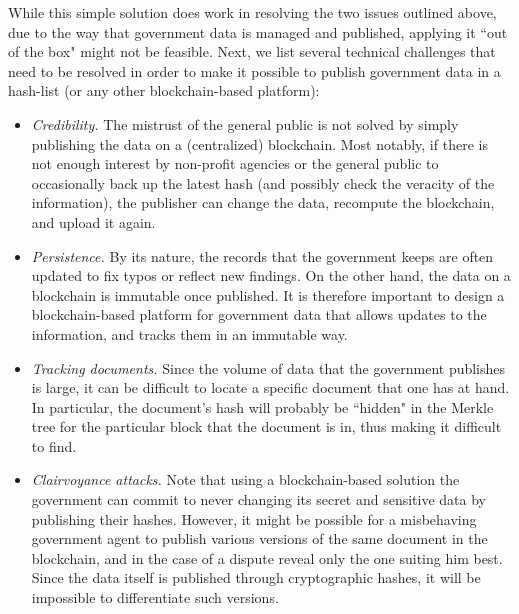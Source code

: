 While this simple solution does work in resolving the two issues outlined above, due to the way that government data is managed and published, applying it ``out of the box" might not be feasible. Next, we list several technical challenges that need to be resolved in order to make it possible to publish government data in a hash-list (or any other blockchain-based platform):
\begin{itemize}
\item {\it Credibility.} The mistrust of the general public is not solved by simply publishing the data on a (centralized) blockchain. Most notably, if there is not enough interest by non-profit agencies or the general public to occasionally back up the latest hash (and possibly check the veracity of the information), the publisher can change the data, recompute the blockchain, and upload it again. %
\item {\it Persistence.} By its nature, the records that the government keeps are often updated to fix typos or reflect new findings. On the other hand, the data on a blockchain is immutable once published. It is therefore important to design a blockchain-based platform for government data that allows updates to the information, and tracks them in an  immutable way.
\item {\it Tracking documents.} Since the volume of data that the government publishes is large, it can be difficult to locate a specific document that one has at hand. In particular, the document's hash will probably be ``hidden" in the Merkle tree for the particular block that the document is in, thus making it difficult to find.%
\item {\it Clairvoyance attacks.} Note that using a blockchain-based solution the government can commit to never changing its secret and sensitive data by publishing their hashes. However, it might be possible for a misbehaving government agent to publish various versions of the same document in the blockchain, and in the case of a dispute reveal only the one suiting him best. Since the data itself is published through cryptographic hashes, it will be impossible to differentiate such versions.
\end{itemize}

